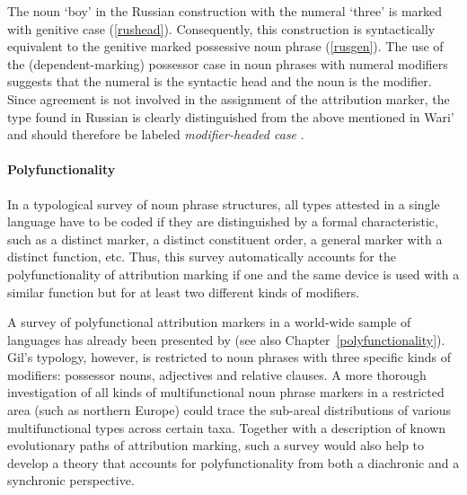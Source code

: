 The noun ‘boy’ in the Russian construction with the numeral ‘three’ is marked with genitive case (\ref{rushead}). Consequently, this construction is syntactically equivalent to the genitive marked possessive noun phrase (\ref{rusgen}). The use of the (dependent\hyp{}marking) possessor case in noun phrases with numeral modifiers suggests that the numeral is the syntactic head and the noun is the modifier. Since agreement is not involved in the assignment of the attribution marker, the type found in Russian is clearly distinguished from the above mentioned  in Wari' and should therefore be labeled \textit{modifier\hyp{}headed case} \citep[cf.][]{AUTOTYP-NP}.

\paragraph*{Polyfunctionality} 
In a typological survey of noun phrase structures, all types attested in a single language have to be coded if they are distinguished by a formal characteristic, such as a distinct marker, a distinct constituent order, a general marker with a distinct function, etc. Thus, this survey automatically accounts for the polyfunctionality of attribution marking if one and the same device is used with a similar function but for at least two different kinds of modifiers.

A survey of polyfunctional attribution markers in a world-wide sample of languages has already been presented by \citet{gil2005} (see also Chapter~\ref{polyfunctionality}). Gil's typology, however, is restricted to noun phrases with three specific kinds of modifiers: possessor nouns, adjectives and relative clauses. A more thorough investigation of all kinds of multifunctional noun phrase markers in a restricted area (such as northern Europe) could trace the sub-areal distributions of various multifunctional types across certain taxa. Together with a description of known evolutionary paths of attribution marking, such a survey would also help to develop a theory that accounts for polyfunctionality from both a diachronic and a synchronic perspective.
